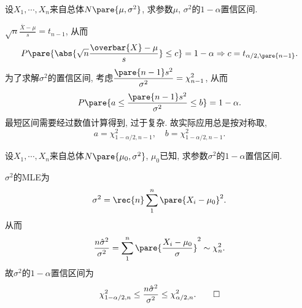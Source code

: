 \documentclass[../Statistics.tex]{subfiles}
\begin{document}
\begin{sample}
    \begin{ex}
        设$X_1,\cdots,X_n$来自总体$N\pare{\mu,\sigma^2}$, 求参数$\mu$, $\sigma^2$的$1-\alpha$置信区间.
    \end{ex}
    \begin{solution}
        $\displaystyle \sqrt{n} \frac{\overbar{X} - \mu}{s} = t_{n-1}$, 从而
        \[ P\pare{\abs{\sqrt{n} \frac{\overbar{X} - \mu}{s}} \le c} = 1-\alpha \Rightarrow c = t_{\alpha/2,\pare{n-1}}. \]
        为了求解$\sigma^2$的置信区间, 考虑$\displaystyle \frac{\pare{n-1}s^2}{\sigma^2} = \chi_{n-1}^2$, 从而
        \[ P\pare{a\le \frac{\pare{n-1}s^2}{\sigma^2} \le b} = 1-\alpha. \]
        最短区间需要经过数值计算得到, 过于复杂. 故实际应用总是按对称取,
        \[ a = \chi^2_{1-\alpha/2, n-1},\quad b = \chi^2_{1-\alpha/2,n-1}. \]
    \end{solution}
\end{sample}
\begin{sample}
    \begin{ex}
        设$X_1,\cdots,X_n$来自总体$N\pare{\mu_0,\sigma^2}$, $\mu_0$已知, 求参数$\sigma^2$的$1-\alpha$置信区间.
    \end{ex}
    \begin{solution}
        $\sigma^2$的MLE为
        \[ \sigma^2 = \rec{n} \sum_{1}^n \pare{X_i - \mu_0}^2. \]
        从而
        \[ \frac{n\hat\sigma^2}{\sigma^2} = \sum_1^n \pare{\frac{X_i-\mu_0}{\sigma}}^2 \sim \chi_n^2. \]
        故$\sigma^2$的$1-\alpha$置信区间为
        \[ \chi_{1-\alpha/2,n}^2 \le \frac{n\hat\sigma^2}{\sigma^2} \le \chi_{\alpha/2,n}^2. \qedhere \]
    \end{solution}
\end{sample}
\end{document}
